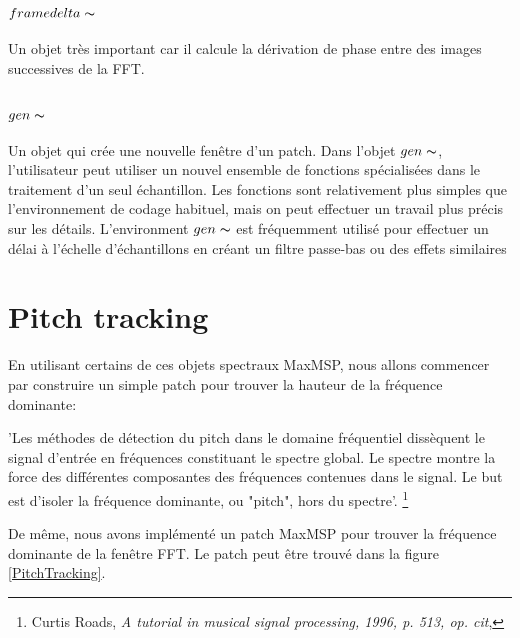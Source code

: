 \subsubsection{$framedelta\thicksim$}
    
    Un objet très important car il calcule la dérivation de phase entre des images successives de la FFT.

\subsubsection{$gen\thicksim$}
    
    Un objet qui crée une nouvelle fenêtre d’un patch. Dans l'objet $ gen \thicksim $, l'utilisateur peut utiliser un nouvel ensemble de fonctions spécialisées dans le traitement d'un seul échantillon. Les fonctions sont relativement plus simples que l'environnement de codage habituel, mais on peut effectuer un travail plus précis sur les détails. L’environment $ gen \thicksim $ est fréquemment utilisé pour effectuer un délai à l'échelle d'échantillons en créant un filtre passe-bas ou des effets similaires

\section{Pitch tracking}

En utilisant certains de ces objets spectraux MaxMSP, nous allons commencer par construire un simple patch pour trouver la hauteur de la fréquence dominante:

     \begin{displayquote}
         'Les méthodes de détection du pitch dans le domaine fréquentiel dissèquent le signal d'entrée en fréquences constituant le spectre global. Le spectre montre la force des différentes composantes des fréquences contenues dans le signal. Le but est d’isoler la fréquence dominante, ou "pitch", hors du spectre'. \footnote{Curtis Roads, \textit{A tutorial in musical signal processing, 1996, p. 513, op. cit}, \nocite{Routes: 1996: CMT: 525484}}
     \end{displayquote}

De même, nous avons implémenté un patch MaxMSP pour trouver la fréquence dominante de la fenêtre FFT. Le patch peut être trouvé dans la figure \ref{PitchTracking}.

